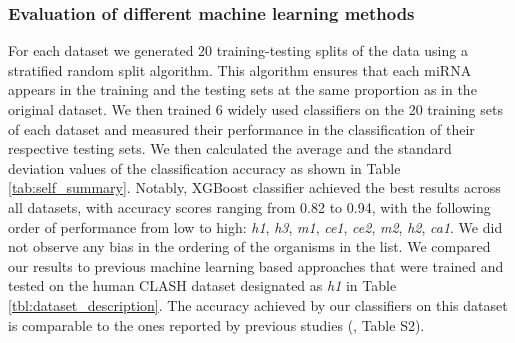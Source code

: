 \documentclass{bmcart}
\begin{document}
\subsubsection*{Evaluation of different machine learning methods} \label{sec:evaluation_different_ML}
For each dataset we generated 20 training-testing splits of the data using a stratified random split algorithm. This algorithm ensures that each miRNA appears in the training and the testing sets at the same proportion as in the original dataset.
We then trained 6 widely used classifiers on the 20 training sets of each dataset and measured their performance in the classification of their respective testing sets. We then calculated the average and the standard deviation values of the classification accuracy as shown in Table \ref{tab:self_summary}. Notably, XGBoost classifier achieved the best results across all datasets, with accuracy scores ranging from 0.82 to 0.94, with the following order of performance from low to high: \textit{h1},  \textit{h3},  \textit{m1}, \textit{ce1}, \textit{ce2}, \textit{m2}, \textit{h2}, \textit{ca1}. We did not observe any bias in the ordering of the organisms in the list.   
We compared our results to previous machine learning based approaches that were trained and tested on the human CLASH dataset designated as \textit{h1} in Table \ref{tbl:dataset_description}. The accuracy achieved by our classifiers on this dataset is comparable to the ones reported by previous studies (, Table S2). 
\end{document}
